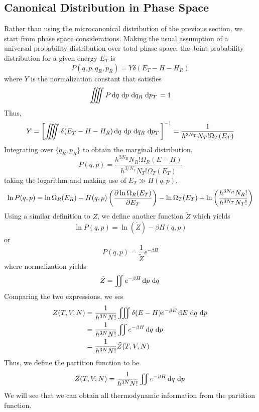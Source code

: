 \subsection{Canonical Distribution in Phase Space}
Rather than using the microcanonical distribution of the previous section, we start from phase space considerations. Making the usual assumption of a universal probability distribution over total phase space, the Joint probability distribution for a given energy \(E_T\) is
\[P(q,p,q_R,p_R) = Y\delta(E_T-H-H_R)\]
where \(Y\) is the normalization constant that satisfies
\[\iiiint P \d{q}\d{p}\d{q_R}\d{p_T}=1\]
Thus, 
\[Y = \left[\iiiint \delta(E_T-H-H_R) \d{q}\d{p}\d{q_R}\d{p_T}\right]^{-1}=\frac{1}{h^{3N_T}N_T!\Omega_T(E_T)}\]
Integrating over \(\{q_R,p_R\}\) to obtain the marginal distribution,
\begin{equation}
	P(q,p) = \frac{h^{3N_R}N_R!\Omega_R(E-H)}{h^{3/N_T}N_T!\Omega_T(E_T)}
\end{equation}
taking the logarithm and making use of \(E_T\gg H(q,p)\),
\[\ln P(q,p) = \ln\Omega_R(E_R)-H(q,p)\left(\frac{\partial \ln\Omega_R(E_T)}{\partial E_T}\right)-\ln\Omega_T(E_T)+\ln\left(\frac{h^{3N_R}N_R!}{h^{3N_T}N_T!}\right)\]
Using a similar definition to \(Z\), we define another function \(\tilde Z\) which yields
\[\ln P(q,p) = \ln(\tilde Z)-\beta H(q,p)\]
or
\[P(q,p) = \frac{1}{\tilde Z}e^{-\beta H}\]
where normalization yields 
\[\tilde Z = \iint e^{-\beta H}\d{p}\d{q}\]
Comparing the two expressions, we ses
\begin{align*}
	Z(T,V,N) &= \frac{1}{h^{3N}{N!}}\iiint\delta (E-H)e^{-\beta E}\d{E}\d{q}\d{p}\\
		 &=\frac{1}{h^{3N}N!}\iint e^{-\beta H}\d{q}\d{p}\\
		 &=\frac{1}{h^{3N}N!}\tilde Z(T,V,N)
\end{align*}
Thus, we define the partition function to be
\begin{equation}
	Z(T,V,N) =\frac{1}{h^{3N}N!}\iint e^{-\beta H}\d{q}\d{p}\label{eq19:part}
\end{equation}
We will see that we can obtain all thermodynamic information from the partition function.

